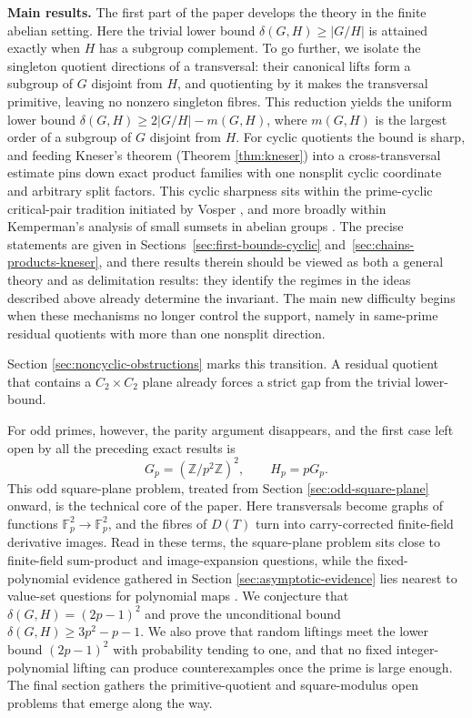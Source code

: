 \documentclass[reqno]{amsart}
\numberwithin{equation}{section}
\theoremstyle{definition}
\begin{document}
\medskip

\noindent\textbf{Main results.}
The first part of the paper develops the theory in the finite abelian setting.
Here the trivial lower bound \(\delta(G,H)\ge |G/H|\) is attained exactly when
\(H\) has a subgroup complement.  To go further, we isolate the singleton
quotient directions of a transversal: their canonical lifts form a subgroup of
\(G\) disjoint from \(H\), and quotienting by it makes the transversal
primitive, leaving no nonzero singleton fibres.  This reduction yields the
uniform lower bound
$ \delta(G,H)\ge 2|G/H|-m(G,H)$,
where \(m(G,H)\) is the largest order of a subgroup of \(G\) disjoint from
\(H\).  For cyclic quotients the bound is sharp, and feeding Kneser's theorem (Theorem \ref{thm:kneser})
into a cross-transversal estimate pins down exact product families with one
nonsplit cyclic coordinate and arbitrary split factors.  This cyclic sharpness
sits within the prime-cyclic critical-pair tradition initiated by Vosper
\cite{Vosper1956}, and more broadly within Kemperman's analysis of small
sumsets in abelian groups \cite{Kemperman1960}.  The precise statements are
given in Sections~\ref{sec:first-bounds-cyclic}
and~\ref{sec:chains-products-kneser}, and there results therein should be viewed as both a general theory and as delimitation
results: they identify the regimes in the ideas described above already determine the invariant. The main new difficulty begins
when these mechanisms no longer control the support, namely in same-prime residual
quotients with more than one nonsplit direction.

Section \ref{sec:noncyclic-obstructions} marks this transition. A residual quotient that contains a \(C_2\times C_2\)
plane already forces a strict gap from the trivial lower-bound. 

For odd primes, however, the parity argument disappears, and the first case left
open by all the preceding exact results is
\[
G_p=(\mathbb Z/p^2\mathbb Z)^2,\qquad H_p=pG_p.
\]
This odd square-plane problem, treated from Section \ref{sec:odd-square-plane} onward, is the technical core
of the paper.
Here transversals become graphs of functions \(\mathbb F_p^2\to\mathbb F_p^2\),
and the fibres of \(D(T)\) turn into carry-corrected finite-field derivative
images.  Read in these terms, the square-plane problem sits close to
finite-field sum-product \cite{BourgainKatzTao2004} and image-expansion
\cite{MurphyPetridis2017} questions, while the fixed-polynomial evidence
gathered in Section \ref{sec:asymptotic-evidence} lies nearest to value-set
questions for polynomial maps \cite{MullenWanWang2013}.  We conjecture that \(\delta(G,H)=(2p-1)^2\) and prove the unconditional bound \( \delta(G,H) \geq 3p^2-p-1\).  We also
prove that random liftings meet the lower bound $(2p-1)^2$ with probability tending to
one, and that no fixed integer-polynomial lifting can produce counterexamples
once the prime is large enough.  The final section gathers the
primitive-quotient and square-modulus open problems that emerge along the way.
\end{document}
